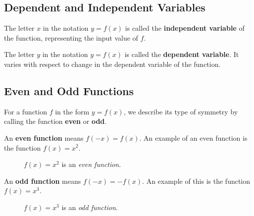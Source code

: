 \subsection{Dependent and Independent Variables}
  The letter \(x\) in the notation \(y=f(x)\) is called the \textbf{independent variable} of the function, representing the input value of \(f\).

  The letter \(y\) in the notation \(y=f(x)\) is called the \textbf{dependent variable}.
  It varies with respect to change in the dependent variable of the function.

\subsection{Even and Odd Functions}

For a function $f$ in the form $y=f(x)$, we describe its type of symmetry by calling the function \textbf{even} or \textbf{odd}.

An \textbf{even function} means $f(-x)=f(x)$.
An example of an even function is the function $f(x)=x^2$.
  \begin{figure}[H]
    \begin{center}
    \end{center}
    \caption{$f(x)=x^2$ is an \emph{even function}.}
  \end{figure}
  An \textbf{odd function} means $f(-x)=-f(x)$. An example of this is the function $f(x)=x^3$.
  \begin{figure}[H]
    \begin{center}
    \end{center}
    \caption{$f(x)=x^3$ is an \emph{odd function}.}
  \end{figure}
